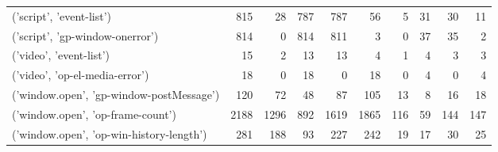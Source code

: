 \begin{tabular}{lrrrrrrrrr}
                    ('script', 'event-list') &                              815 &                                 28 &                                    787 &                          787 &                          56 &                                   5 &                                     31 &                            30 &                           11 \\
             ('script', 'gp-window-onerror') &                              814 &                                  0 &                                    814 &                          811 &                           3 &                                   0 &                                     37 &                            35 &                            2 \\
                     ('video', 'event-list') &                               15 &                                  2 &                                     13 &                           13 &                           4 &                                   1 &                                      4 &                             3 &                            3 \\
              ('video', 'op-el-media-error') &                               18 &                                  0 &                                     18 &                            0 &                          18 &                                   0 &                                      4 &                             0 &                            4 \\
    ('window.open', 'gp-window-postMessage') &                              120 &                                 72 &                                     48 &                           87 &                         105 &                                  13 &                                      8 &                            16 &                           18 \\
           ('window.open', 'op-frame-count') &                             2188 &                               1296 &                                    892 &                         1619 &                        1865 &                                 116 &                                     59 &                           144 &                          147 \\
    ('window.open', 'op-win-history-length') &                              281 &                                188 &                                     93 &                          227 &                         242 &                                  19 &                                     17 &                            30 &                           25 \\

\end{tabular}
